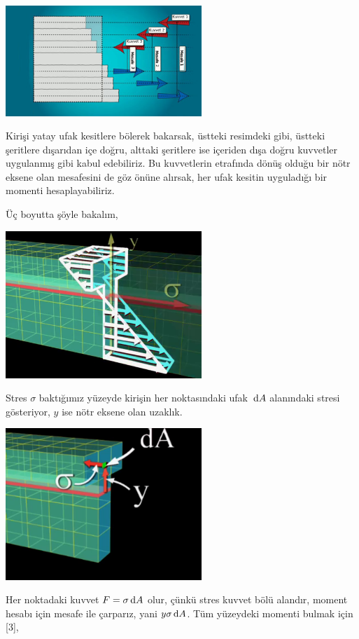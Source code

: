 \documentclass[12pt,fleqn]{article}\usepackage{../../common}
\begin{document}
\includegraphics[width=20em]{phy_020_strs_01_09.jpg}

Kirişi yatay ufak kesitlere bölerek bakarsak, üstteki resimdeki gibi, üstteki
şeritlere dışarıdan içe doğru, alttaki şeritlere ise içeriden dışa doğru
kuvvetler uygulanmış gibi kabul edebiliriz. Bu kuvvetlerin etrafında dönüş
olduğu bir nötr eksene olan mesafesini de göz önüne alırsak, her ufak kesitin
uyguladığı bir momenti hesaplayabiliriz.

Üç boyutta şöyle bakalım,

\includegraphics[width=20em]{phy_020_strs_01_07.jpg}

Stres $\sigma$ baktığımız yüzeyde kirişin her noktasındaki ufak $\,\mathrm{d} A$
alanındaki stresi gösteriyor, $y$ ise nötr eksene olan uzaklık. 

\includegraphics[width=20em]{phy_020_strs_01_08.jpg}

Her noktadaki kuvvet $F = \sigma \,\mathrm{d} A$ olur, çünkü stres kuvvet bölü alandır,
moment hesabı için mesafe ile çarparız, yani $y \sigma \,\mathrm{d} A$. Tüm yüzeydeki
momenti bulmak için [3],
\end{document}
